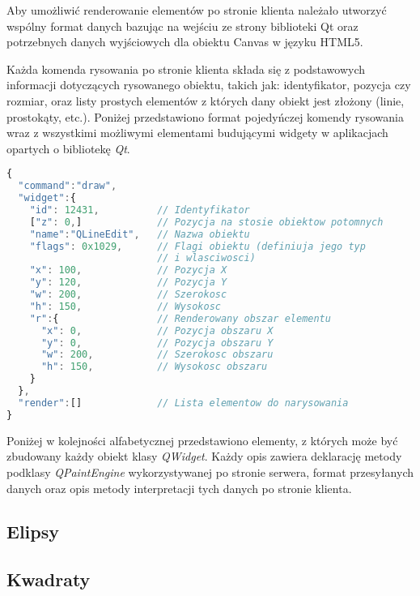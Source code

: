 
Aby umożliwić renderowanie elementów po stronie klienta należało utworzyć wspólny format danych bazując na wejściu ze strony biblioteki Qt oraz potrzebnych danych wyjściowych dla obiektu Canvas w języku HTML5. 

Każda komenda rysowania po stronie klienta składa się z podstawowych informacji dotyczących rysowanego obiektu, takich jak: identyfikator, pozycja czy rozmiar, oraz listy prostych elementów z których dany obiekt jest złożony (linie, prostokąty, etc.). Poniżej przedstawiono format pojedyńczej komendy rysowania wraz z wszystkimi możliwymi elementami budującymi widgety w aplikacjach opartych o bibliotekę \emph{Qt}.


\begin{lstlisting}[language=JavaScript,numbers=none,caption=Komenda renderowania elementu interfejsu]
{
  "command":"draw",
  "widget":{
    "id": 12431,          // Identyfikator
    ["z": 0,]             // Pozycja na stosie obiektow potomnych
    "name":"QLineEdit",   // Nazwa obiektu
    "flags": 0x1029,      // Flagi obiektu (definiuja jego typ 
                          // i wlasciwosci)
    "x": 100,             // Pozycja X
    "y": 120,             // Pozycja Y
    "w": 200,             // Szerokosc
    "h": 150,             // Wysokosc
    "r":{                 // Renderowany obszar elementu
      "x": 0,             // Pozycja obszaru X
      "y": 0,             // Pozycja obszaru Y
      "w": 200,           // Szerokosc obszaru
      "h": 150,           // Wysokosc obszaru
    }
  },
  "render":[]             // Lista elementow do narysowania
}
\end{lstlisting}

Poniżej w kolejności alfabetycznej przedstawiono elementy, z których może być zbudowany każdy obiekt klasy \emph{QWidget}. Każdy opis zawiera deklarację metody podklasy \emph{QPaintEngine} wykorzystywanej po stronie serwera, format przesyłanych danych oraz opis metody interpretacji tych danych po stronie klienta.

\subsection{Elipsy}


\subsection{Kwadraty}


